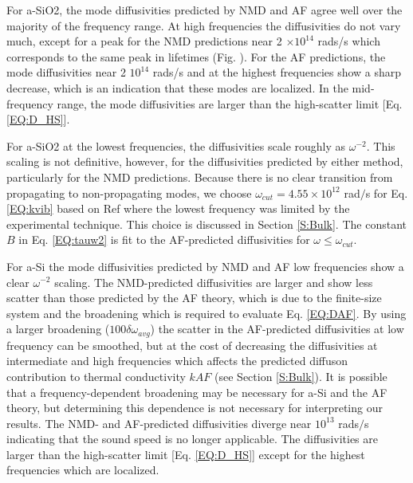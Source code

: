\documentclass[aps,prb,onecolumn,preprint,superscriptaddress,footinbib,amsmath,amssymb,floatfix]{revtex4}
\begin{document}
For a-SiO2, the mode diffusivities predicted by NMD and AF agree 
well over the majority of the frequency range. At high frequencies the 
diffusivities do not vary much, except for a 
peak for the NMD predictions near 2 $\times 10^{14}$ rads/s which 
corresponds to the same peak in lifetimes (Fig. ). For 
the AF predictions, the mode diffusivities near 
2 $10^{14}$ rads/s and at the highest frequencies 
show a sharp decrease, which is an indication 
that these modes are localized.\cite{feldman_thermal_1993} In the 
mid-frequency range, the mode diffusivities are larger than the 
high-scatter limit [Eq. \eqref{EQ:D_HS}].

For a-SiO2 at the lowest frequencies, the 
diffusivities scale roughly as $\omega^{-2}$.  
This 
scaling is not definitive, however, for the diffusivities predicted by either 
method, particularly for the NMD predictions. 
Because there is no clear transition from propagating 
to non-propagating modes, we choose $\omega_{cut} = 4.55\times10^{12}$ rad$/$s 
for Eq. \eqref{EQ:kvib}  
based on Ref  where the lowest frequency was limited 
by the experimental technique. 
This choice is discussed in Section \ref{S:Bulk}. The constant 
$B$ in Eq. \eqref{EQ:tauw2} 
is fit to the AF-predicted diffusivities for 
$\omega \le \omega_{cut}$.

For a-Si the mode diffusivities predicted by NMD and AF 
low frequencies show a clear $\omega^{-2}$ scaling. 
The NMD-predicted diffusivities are larger and show less 
scatter than those predicted by the AF theory, which is due to 
the finite-size system and the broadening which is required to evaluate 
Eq. \eqref{EQ:DAF}.\cite{feldman_thermal_1993} By using a larger 
broadening ($100\delta\omega_{avg}$) the scatter in the AF-predicted 
diffusivities at low frequency can be smoothed, but at the cost of 
decreasing the diffusivities at intermediate and high frequencies which 
affects the predicted diffuson contribution to thermal conductivity 
$k{AF}$ (see Section \ref{S:Bulk}). 
It is possible that a frequency-dependent broadening may be necessary 
for a-Si and the AF theory,  
but determining this dependence is not necessary for 
interpreting our results. The NMD- and AF-predicted diffusivities diverge 
near $10^{13}$ rads$/$s indicating that the sound speed is no longer 
applicable. The diffusivities are 
larger than the high-scatter limit [Eq. \eqref{EQ:D_HS}] except for the 
highest frequencies which are localized.\cite{feldman_thermal_1993} 
\end{document}
